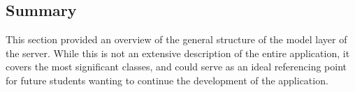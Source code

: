 \subsection{Summary}
This section provided an overview of the general structure of the model layer of the server. While this is not an extensive description of the entire application, it covers the most significant classes, and could serve as an ideal referencing point for future students wanting to continue the development of the application.